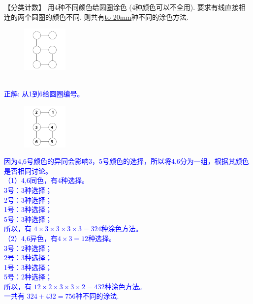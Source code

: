 \item {
    【分类计数】
    用4种不同颜色给圆圈涂色 (4种颜色可以不全用). 要求有线直接相连的两个圆圈的颜色不同. 则共有\underline{\hbox to 20mm{}}种不同的涂色方法.
    \begin{figure}[H] 
        \centering
        \includegraphics[width=0.2\textwidth]{./pics/Chapter_4/2016_3.png}
    \end{figure}
    \ifshowSolution 
        \fangsong{}\textcolor{blue}{
            \\正解: 从1到6给圆圈编号。\\
            \begin{figure}[H] 
                \centering
                \includegraphics[width=0.2\textwidth]{./pics/Chapter_4/seikai_2016_3.png}
            \end{figure}
            因为4,6号颜色的异同会影响3，5号颜色的选择，所以将4,6分为一组，根据其颜色是否相同讨论。\\
            （1）4,6同色，有4种选择。\\
            3号：3种选择；\\
            2号：3种选择；\\
            1号：3种选择；\\
            5号：3种选择；\\
            所以，有 $4\times 3\times 3\times 3\times 3=324$种涂色方法。\\
            （2）4,6异色，有$4\times 3=12$种选择。\\
            3号：2种选择；\\
            2号：3种选择；\\
            1号：3种选择；\\
            5号：2种选择；\\
            所以，有 $12\times 2\times 3\times 3\times 2=432$种涂色方法。\\
            一共有 $324+432=756$种不同的涂法.
        }
    \else
        \vspace{1cm}
    \fi
}

